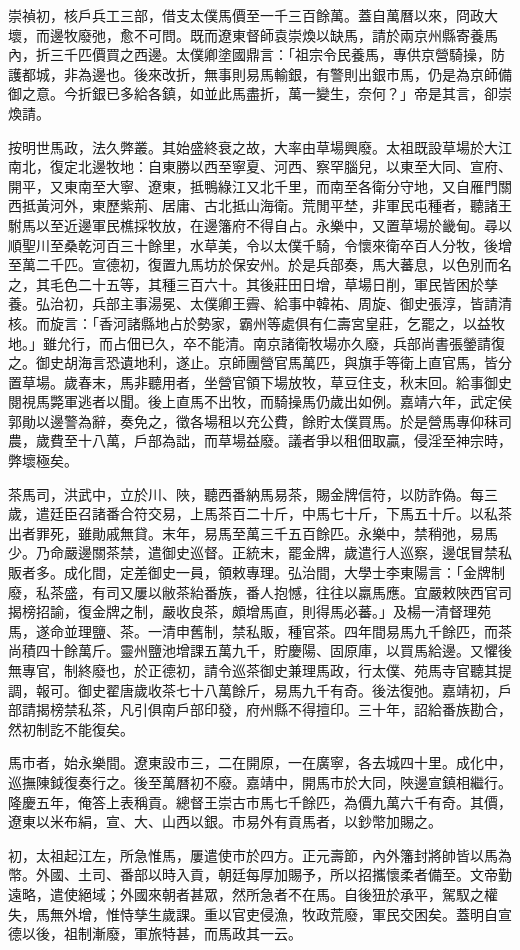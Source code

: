 崇禎初，核戶兵工三部，借支太僕馬價至一千三百餘萬。蓋自萬曆以來，冏政大壞，而邊牧廢弛，愈不可問。既而遼東督師袁崇煥以缺馬，請於兩京州縣寄養馬內，折三千匹價買之西邊。太僕卿塗國鼎言：「祖宗令民養馬，專供京營騎操，防護都城，非為邊也。後來改折，無事則易馬輸銀，有警則出銀市馬，仍是為京師備御之意。今折銀已多給各鎮，如並此馬盡折，萬一變生，奈何？」帝是其言，卻崇煥請。

按明世馬政，法久弊叢。其始盛終衰之故，大率由草場興廢。太祖既設草場於大江南北，復定北邊牧地：自東勝以西至寧夏、河西、察罕腦兒，以東至大同、宣府、開平，又東南至大寧、遼東，抵鴨綠江又北千里，而南至各衛分守地，又自雁門關西抵黃河外，東歷紫荊、居庸、古北抵山海衛。荒閒平埜，非軍民屯種者，聽諸王駙馬以至近邊軍民樵採牧放，在邊籓府不得自占。永樂中，又置草場於畿甸。尋以順聖川至桑乾河百三十餘里，水草美，令以太僕千騎，令懷來衛卒百人分牧，後增至萬二千匹。宣德初，復置九馬坊於保安州。於是兵部奏，馬大蕃息，以色別而名之，其毛色二十五等，其種三百六十。其後莊田日增，草場日削，軍民皆困於孳養。弘治初，兵部主事湯冕、太僕卿王霽、給事中韓祐、周旋、御史張淳，皆請清核。而旋言：「香河諸縣地占於勢家，霸州等處俱有仁壽宮皇莊，乞罷之，以益牧地。」雖允行，而占佃已久，卒不能清。南京諸衛牧場亦久廢，兵部尚書張鎣請復之。御史胡海言恐遺地利，遂止。京師團營官馬萬匹，與旗手等衛上直官馬，皆分置草場。歲春末，馬非聽用者，坐營官領下場放牧，草豆住支，秋末回。給事御史閱視馬斃軍逃者以聞。後上直馬不出牧，而騎操馬仍歲出如例。嘉靖六年，武定侯郭勛以邊警為辭，奏免之，徵各場租以充公費，餘貯太僕買馬。於是營馬專仰秣司農，歲費至十八萬，戶部為詘，而草場益廢。議者爭以租佃取贏，侵淫至神宗時，弊壞極矣。

茶馬司，洪武中，立於川、陜，聽西番納馬易茶，賜金牌信符，以防詐偽。每三歲，遣廷臣召諸番合符交易，上馬茶百二十斤，中馬七十斤，下馬五十斤。以私茶出者罪死，雖勛戚無貸。末年，易馬至萬三千五百餘匹。永樂中，禁稍弛，易馬少。乃命嚴邊關茶禁，遣御史巡督。正統末，罷金牌，歲遣行人巡察，邊氓冒禁私販者多。成化間，定差御史一員，領敕專理。弘治間，大學士李東陽言：「金牌制廢，私茶盛，有司又屢以敝茶紿番族，番人抱憾，往往以羸馬應。宜嚴敕陜西官司揭榜招諭，復金牌之制，嚴收良茶，頗增馬直，則得馬必蕃。」及楊一清督理苑馬，遂命並理鹽、茶。一清申舊制，禁私販，種官茶。四年間易馬九千餘匹，而茶尚積四十餘萬斤。靈州鹽池增課五萬九千，貯慶陽、固原庫，以買馬給邊。又懼後無專官，制終廢也，於正德初，請令巡茶御史兼理馬政，行太僕、苑馬寺官聽其提調，報可。御史翟唐歲收茶七十八萬餘斤，易馬九千有奇。後法復弛。嘉靖初，戶部請揭榜禁私茶，凡引俱南戶部印發，府州縣不得擅印。三十年，詔給番族勘合，然初制訖不能復矣。

馬市者，始永樂間。遼東設市三，二在開原，一在廣寧，各去城四十里。成化中，巡撫陳鉞復奏行之。後至萬曆初不廢。嘉靖中，開馬市於大同，陜邊宣鎮相繼行。隆慶五年，俺答上表稱貢。總督王崇古市馬七千餘匹，為價九萬六千有奇。其價，遼東以米布絹，宣、大、山西以銀。市易外有貢馬者，以鈔幣加賜之。

初，太祖起江左，所急惟馬，屢遣使市於四方。正元壽節，內外籓封將帥皆以馬為幣。外國、土司、番部以時入貢，朝廷每厚加賜予，所以招攜懷柔者備至。文帝勤遠略，遣使絕域；外國來朝者甚眾，然所急者不在馬。自後狃於承平，駕馭之權失，馬無外增，惟恃孳生歲課。重以官吏侵漁，牧政荒廢，軍民交困矣。蓋明自宣德以後，祖制漸廢，軍旅特甚，而馬政其一云。


